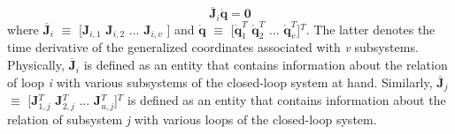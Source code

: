 {	\begin{equation}
	\label{eqn:Jidotq}
	\mbox{$\overline{\textbf{J}}_{i}$}\dot{\textbf{q}} = \textbf{0}
	\end{equation}
where \mbox{$\overline{\textbf{J}}_{i}$} $\equiv$ [\textbf{J}$_{i,1}$ \textbf{J}$_{i,2}$  ... \textbf{J}$_{i,v}$ ] and  $\dot{\textbf{q}}$ $\equiv$ [$\dot{\textbf{q}}_1^T$ $\dot{\textbf{q}}_2^T$ ... $\dot{\textbf{q}}_v^T$]$^T$. The latter denotes the time derivative of the generalized coordinates associated with \emph{v} subsystems. Physically, \mbox{$\overline{\textbf{J}}_{i}$} is defined as an entity that contains information about the relation of loop \emph{i} with various subsystems of the closed-loop system at hand. Similarly, \mbox{$\overline{\textbf{J}}_{j}$} $\equiv$ [\textbf{J}$_{1,j}^T$ \textbf{J}$_{2,j}^T$  ... \textbf{J}$_{u,j}^T$]$^T$ is defined as an entity that contains information about the relation of subsystem \emph{j} with various loops of the closed-loop system.

}
